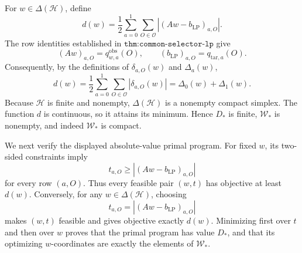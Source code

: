 For \(w\in\Delta(\mathcal H)\), define
\[
d(w)=\frac12\sum_{a=0}^1\sum_{O\in\mathcal O}|(Aw-b_{\mathrm{LP}})_{a,O}|.
\tag{1}
\]
The row identities established in \(\texttt{thm:common-selector-lp}\) give
\[
(Aw)_{a,O}=q^{\mathrm{obs}}_{w,a}(O),\qquad (b_{\mathrm{LP}})_{a,O}=q_{\mathrm{tar},a}(O).
\tag{2}
\]
Consequently, by the definitions of \(\delta_{a,O}(w)\) and \(\Delta_a(w)\),
\[
d(w)=\frac12\sum_{a=0}^1\sum_{O\in\mathcal O}|\delta_{a,O}(w)|=\Delta_0(w)+\Delta_1(w).
\tag{3}
\]
Because \(\mathcal H\) is finite and nonempty, \(\Delta(\mathcal H)\) is a nonempty compact simplex. The function \(d\) is continuous, so it attains its minimum. Hence \(D_*\) is finite, \(\mathcal W_*\) is nonempty, and indeed \(\mathcal W_*\) is compact.

We next verify the displayed absolute-value primal program. For fixed \(w\), its two-sided constraints imply
\[
t_{a,O}\ge |(Aw-b_{\mathrm{LP}})_{a,O}|
\tag{4}
\]
for every row \((a,O)\). Thus every feasible pair \((w,t)\) has objective at least \(d(w)\). Conversely, for any \(w\in\Delta(\mathcal H)\), choosing
\[
t_{a,O}=|(Aw-b_{\mathrm{LP}})_{a,O}|
\tag{5}
\]
makes \((w,t)\) feasible and gives objective exactly \(d(w)\). Minimizing first over \(t\) and then over \(w\) proves that the primal program has value \(D_*\), and that its optimizing \(w\)-coordinates are exactly the elements of \(\mathcal W_*\).

